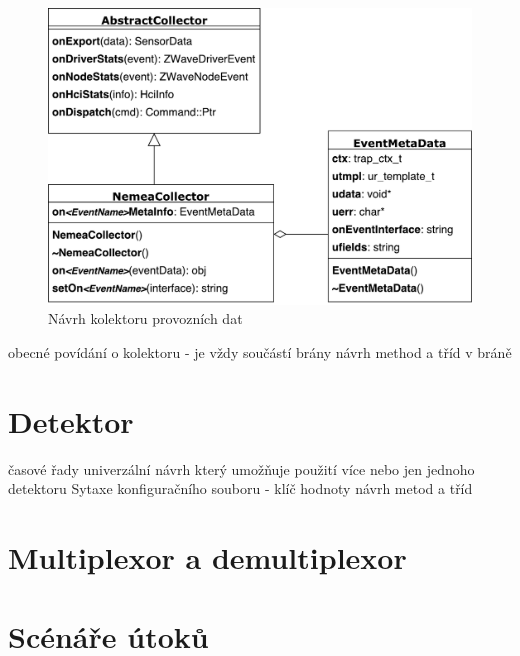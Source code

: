  \begin{figure}[ht]
   \begin{center}
   \includegraphics[scale=0.5]{pictures/modelTrid}
   \caption{Návrh kolektoru provozních dat}
   \label{obr.modelTrid}
   \end{center}
   \end{figure}
 
 obecné povídání o kolektoru - je vždy součástí brány
 návrh method a tříd v bráně
    
 \section{Detektor}
  časové řady
  univerzální návrh který umožňuje použití více nebo jen jednoho detektoru
  Sytaxe konfiguračního souboru - klíč hodnoty
  návrh metod a tříd 
  
 \section{Multiplexor a demultiplexor}
 
 \section{Scénáře útoků}
